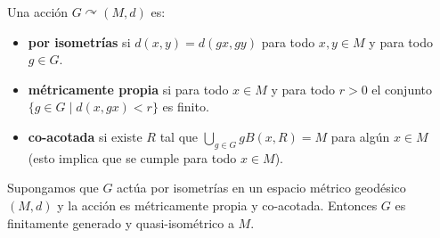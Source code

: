 \documentclass[twoside, 11pt]{article}
\begin{document}
\begin{defi}
Una acción $G\curvearrowright (M,d)$ es:
\begin{itemize}
\item \textbf{por isometrías} si $d(x,y)=d(gx,gy)$ para todo $x,y\in M$ y para todo $g\in G$. 
\item \textbf{métricamente propia} si para todo $x\in M$ y para todo $r>0$ el conjunto $\{g\in G\mid d(x,gx)<r\}$ es finito.
\item \textbf{co-acotada} si existe $R$ tal que $\bigcup_{g\in G} gB(x,R)=M$ para algún $x\in M$ (esto implica que se cumple para todo $x\in M$).
\end{itemize}
\end{defi}

\begin{lemma}
Supongamos que $G$ actúa por isometrías en un espacio métrico geodésico $(M,d)$ y la acción es métricamente propia y co-acotada. Entonces $G$ es finitamente generado y quasi-isométrico a $M$. 
\end{lemma}
\end{document}
